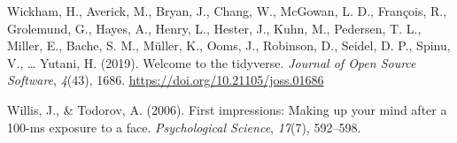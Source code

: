 \documentclass[
  man,
  floatsintext,
  longtable,
  nolmodern,
  notxfonts,
  notimes,
  colorlinks=true,linkcolor=blue,citecolor=blue,urlcolor=blue]{apa7}
\newlength{\cslhangindent}
\newenvironment{CSLReferences}[2] %
 {\begin{list}{}{%
  \setlength{\itemindent}{0pt}
  \setlength{\leftmargin}{0pt}
  \setlength{\parsep}{0pt}
  \ifodd #1
   \setlength{\leftmargin}{\cslhangindent}
   \setlength{\itemindent}{-1\cslhangindent}
  \fi
  \setlength{\itemsep}{#2\baselineskip}}}
 {\end{list}}
\begin{document}
\begin{CSLReferences}{1}{0}
Wickham, H., Averick, M., Bryan, J., Chang, W., McGowan, L. D.,
François, R., Grolemund, G., Hayes, A., Henry, L., Hester, J., Kuhn, M.,
Pedersen, T. L., Miller, E., Bache, S. M., Müller, K., Ooms, J.,
Robinson, D., Seidel, D. P., Spinu, V., \ldots{} Yutani, H. (2019).
Welcome to the {tidyverse}. \emph{Journal of Open Source Software},
\emph{4}(43), 1686. \url{https://doi.org/10.21105/joss.01686}

Willis, J., \& Todorov, A. (2006). First impressions: Making up your
mind after a 100-ms exposure to a face. \emph{Psychological Science},
\emph{17}(7), 592--598.

\end{CSLReferences}
\end{document}
